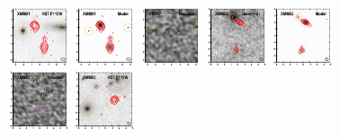 \documentclass[iop]{emulateapj}
\begin{document}
\begin{figure}[!tbp] 
    \begin{centering}
\includegraphics[width=0.162\textwidth]{../Figures/modelfit/XMM01_optical_bestfit.pdf}
\includegraphics[width=0.162\textwidth]{../Figures/modelfit/XMM01_model_bestfit.pdf}
\includegraphics[width=0.162\textwidth]{../Figures/modelfit/XMM01_residual_bestfit.pdf}
\includegraphics[width=0.162\textwidth]{../Figures/modelfit/XMM02_optical_bestfit.pdf}
\includegraphics[width=0.162\textwidth]{../Figures/modelfit/XMM02_model_bestfit.pdf}
\includegraphics[width=0.162\textwidth]{../Figures/modelfit/XMM02_residual_bestfit.pdf}
\includegraphics[width=0.162\textwidth]{../Figures/modelfit/XMM03_optical_bestfit.pdf}

\end{centering}
\end{figure}
\end{document}

